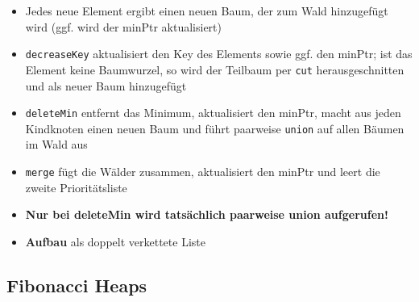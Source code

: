 \documentclass[10pt,a4paper]{article}
\begin{document}
 	\begin{itemize}
 		\item Jedes neue Element ergibt einen neuen Baum, der zum Wald hinzugefügt wird (ggf. wird der minPtr aktualisiert)
 		\item \texttt{decreaseKey} aktualisiert den Key des Elements sowie ggf. den minPtr; ist das Element keine Baumwurzel, so wird der Teilbaum per \texttt{cut} herausgeschnitten und als neuer Baum hinzugefügt
 		\item \texttt{deleteMin} entfernt das Minimum, aktualisiert den minPtr, macht aus jeden Kindknoten einen neuen Baum und führt paarweise \texttt{union} auf allen Bäumen im Wald aus
 		\item \texttt{merge} fügt die Wälder zusammen, aktualisiert den minPtr und leert die zweite Prioritätsliste
 		\item \textbf{Nur bei deleteMin wird tatsächlich paarweise union aufgerufen!}
 		\item \textbf{Aufbau} als doppelt verkettete Liste
  	\end{itemize}

  	\newpage
  	\subsection{Fibonacci Heaps}
  	\label{pl:sub:fibonacci_heaps}
  	
\end{document}
